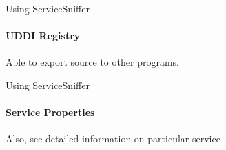 \documentclass{beamer}
\begin{document}

\begin{frame}{Using ServiceSniffer}
    \framesubtitle{UDDI Registry}
    Able to export source to other programs.
\end{frame}


\begin{frame}{Using ServiceSniffer}
    \framesubtitle{Service Properties}
    Also, see detailed information on particular service
\end{frame}
\end{document}
